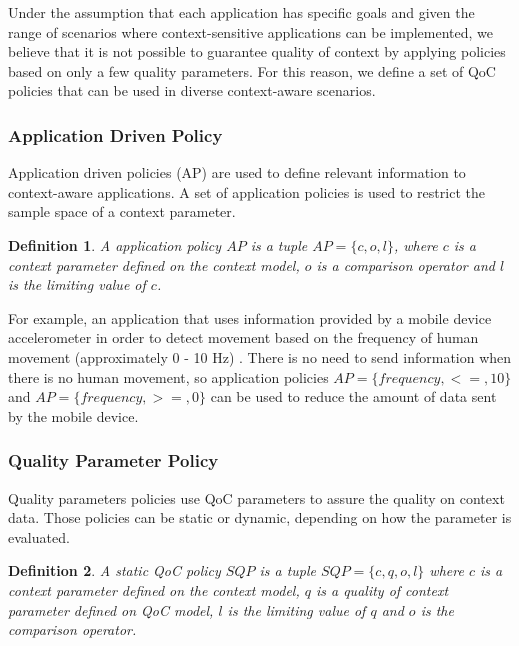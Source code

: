 \documentclass[letterpaper,conference]{IEEEtran}
\newtheorem{definition}{Definition}
\begin{document}
 Under the assumption that each application has specific goals and given the range 
 of scenarios where context-sensitive applications can be implemented, we believe that 
 it is not possible to guarantee quality of context by applying policies based on only 
 a few quality parameters. For this reason, we define a set of QoC policies that can be 
 used in diverse context-aware scenarios.
 
 \subsubsection{Application Driven Policy}
  
  Application driven policies (AP) are used to define relevant information to  
  context-aware applications. A set of application policies is used to restrict 
  the sample space of a context parameter.
  
  \begin{definition}
   A application policy $AP$ is a tuple $AP = \{c,o,l\}$, where $c$ is a context 
   parameter defined on the context model, $o$ is a comparison operator and $l$ is 
   the limiting value of $c$.
  \end{definition}
  
  For example, an application that uses information provided by a mobile device 
  accelerometer in order to detect movement based on the frequency of human movement 
  (approximately 0 - 10 Hz) \cite{lester2004you}. There is no need to send information 
  when there is no human movement, so application policies $AP = \{frequency, <=, 10 \}$
  and $AP = \{frequency, >=, 0\}$ can be used to reduce the amount of data sent by the 
  mobile device.   
  
 \subsubsection{Quality Parameter Policy}
     
  Quality parameters policies use QoC parameters to assure the quality on context data. 
  Those policies can be static or dynamic, depending on how the parameter is evaluated.
  
  \begin{definition}
    A static QoC policy $SQP$ is a tuple $SQP = \{c, q, o, l\}$ where $c$ is a context 
    parameter defined on the context model, $q$ is a quality of context parameter 
    defined on QoC model, $l$ is the limiting value of $q$ and $o$ is the comparison 
    operator.
  \end{definition}  
  
\end{document}

